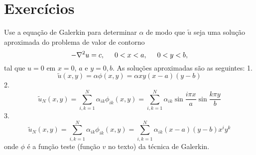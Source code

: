 \documentclass[10pt,a4paper]{article}
\begin{document}
	\section{Exercícios}
	Use a equação de Galerkin para determinar $\alpha$ de modo que $\tilde{u}$ seja uma solução aproximada do problema de valor de contorno
	\[-\nabla^2u=c, \hspace{0.5cm} 0<x<a, \hspace{0.5cm} 0<y<b,\]
	tal que $u=0$ em $x=0$, $a$ e $y=0,b$. As soluções aproximadas são as seguintes:
	1. \[\tilde{u}(x,y) = \alpha\phi(x,y) = \alpha xy(x-a)(y-b)\]
	2. \[\tilde{u}_N(x,y) = \sum_{i,k=1}^N \alpha_{ik}\phi_{ik}(x,y) = \sum_{i,k=1}^N\alpha_{ik}\sin{\frac{i\pi x}{a}}\sin{\frac{k\pi y}{b}}\]
	3. \[\tilde{u}_N(x,y) = \sum_{i,k=1}^N \alpha_{ik}\phi_{ik}(x,y) = \sum_{i,k=1}^N\alpha_{ik}(x-a)(y-b)x^iy^k\]
	onde $\phi$ é a função teste (função $v$ no texto) da técnica de Galerkin.
	
\end{document}
